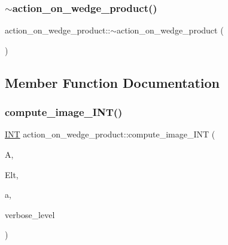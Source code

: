 \subsubsection{\texorpdfstring{$\sim$action\+\_\+on\+\_\+wedge\+\_\+product()}{~action\_on\_wedge\_product()}}
{\footnotesize\ttfamily action\+\_\+on\+\_\+wedge\+\_\+product\+::$\sim$action\+\_\+on\+\_\+wedge\+\_\+product (\begin{DoxyParamCaption}{ }\end{DoxyParamCaption})}



\subsection{Member Function Documentation}
\mbox{\label{classaction__on__wedge__product_a54b13528f0219a5c1a87386725cc9548}} 
\subsubsection{\texorpdfstring{compute\+\_\+image\+\_\+\+I\+N\+T()}{compute\_image\_INT()}}
{\footnotesize\ttfamily \mbox{\hyperlink{galois_8h_a09fddde158a3a20bd2dcadb609de11dc}{I\+NT}} action\+\_\+on\+\_\+wedge\+\_\+product\+::compute\+\_\+image\+\_\+\+I\+NT (\begin{DoxyParamCaption}\item[{\mbox{\hyperlink{classaction}{action}} \&}]{A,  }\item[{\mbox{\hyperlink{galois_8h_a09fddde158a3a20bd2dcadb609de11dc}{I\+NT}} $\ast$}]{Elt,  }\item[{\mbox{\hyperlink{galois_8h_a09fddde158a3a20bd2dcadb609de11dc}{I\+NT}}}]{a,  }\item[{\mbox{\hyperlink{galois_8h_a09fddde158a3a20bd2dcadb609de11dc}{I\+NT}}}]{verbose\+\_\+level }\end{DoxyParamCaption})}

\mbox{\label{classaction__on__wedge__product_a4db8aa51b8d6d7fcdacbf2947aa7e018}} 
